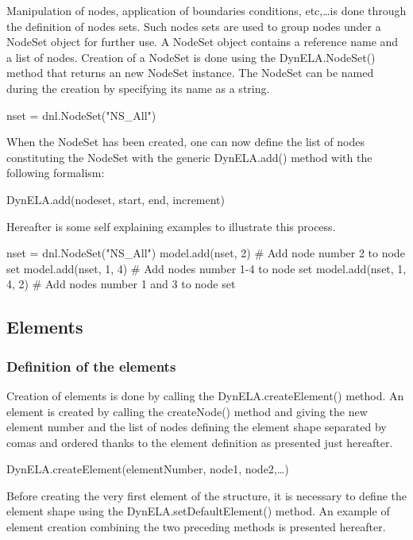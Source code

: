 Manipulation of nodes, application of boundaries conditions, etc,\ldots is done through the definition of nodes sets. Such nodes sets are used to group nodes under a \textsf{NodeSet} object for further use. A \textsf{NodeSet} object contains a reference name and a list of nodes. Creation of a \textsf{NodeSet} is done using the \textsf{DynELA.NodeSet()} method that returns an new \textsf{NodeSet} instance. The \textsf{NodeSet} can be named during the creation by specifying its name as a string.

\begin{PythonListing}
nset = dnl.NodeSet("NS_All")
\end{PythonListing}

When the \textsf{NodeSet} has been created, one can now define the list of nodes constituting the \textsf{NodeSet} with the generic \textsf{DynELA.add()} method with the following formalism:

\textsf{DynELA.add(nodeset, start, end, increment)}

Hereafter is some self explaining examples to illustrate this process.

\begin{PythonListing}
nset = dnl.NodeSet("NS_All")
model.add(nset, 2)       # Add node number 2 to node set
model.add(nset, 1, 4)    # Add nodes number 1-4 to node set
model.add(nset, 1, 4, 2) # Add nodes number 1 and 3 to node set
\end{PythonListing}

\subsection{Elements}

\subsubsection{Definition of the elements}

Creation of elements is done by calling the \textsf{DynELA.createElement()} method. An element is created by calling the \textsf{createNode()} method and giving the new element number and the list of nodes defining the element shape separated by comas and ordered thanks to the element definition as presented just hereafter.

\textsf{DynELA.createElement(elementNumber, node1, node2,\ldots)}

Before creating the very first element of the structure, it is necessary to define the element shape using the \textsf{DynELA.setDefaultElement()} method. An example of element creation combining the two preceding methods is presented hereafter.

